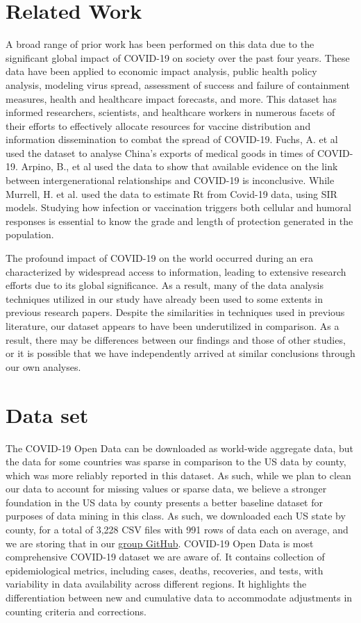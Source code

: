 \documentclass[sigconf,screen,nonacm]{acmart}
\begin{document}
\section{Related Work}
A broad range of prior work has been performed on this data due to the significant global impact of COVID-19 on society over the past four years. These data have been applied to economic impact analysis, public health policy analysis, modeling virus spread, assessment of success and failure of containment measures, health and healthcare impact forecasts, and more. This dataset has informed researchers, scientists, and healthcare workers in numerous facets of their efforts to effectively allocate resources for vaccine distribution and information dissemination to combat the spread of COVID-19. Fuchs, A. et al \cite{fuchs2020mask} used the dataset to analyse China’s exports of medical goods in times of COVID-19. Arpino, B., et al \cite{arpino2020no} used the data to show that available evidence on the link between intergenerational relationships and COVID-19 is inconclusive. While Murrell, H. et al. \cite{murrell2020estimating} used the data to estimate Rt from Covid-19 data, using SIR models. Studying how infection or vaccination triggers both cellular and humoral responses is essential to know the grade and length of protection generated in the population.

The profound impact of COVID-19 on the world occurred during an era characterized by widespread access to information, leading to extensive research efforts due to its global significance. As a result, many of the data analysis techniques utilized in our study have already been used to some extents in previous research papers. Despite the similarities in techniques used in previous literature, our dataset appears to have been underutilized in comparison. As a result, there may be differences between our findings and those of other studies, or it is possible that we have independently arrived at similar conclusions through our own analyses.

\section{Data set}
The COVID-19 Open Data can be downloaded as world-wide aggregate data, but the data for some countries was sparse in comparison to the US data by county, which was more reliably reported in this dataset. As such, while we plan to clean our data to account for missing values or sparse data, we believe a stronger foundation in the US data by county presents a better baseline dataset for purposes of data mining in this class. As such, we downloaded each US state by county, for a total of 3,228 CSV files with 991 rows of data each on average, and we are storing that in our \href{https://github.com/CCoakley6/DataMiningProjectSpring2024}{group GitHub}. COVID-19 Open Data is most comprehensive COVID-19 dataset we are aware of. It contains collection of epidemiological metrics, including cases, deaths, recoveries, and tests, with variability in data availability across different regions. It highlights the differentiation between new and cumulative data to accommodate adjustments in counting criteria and corrections.
\end{document}
